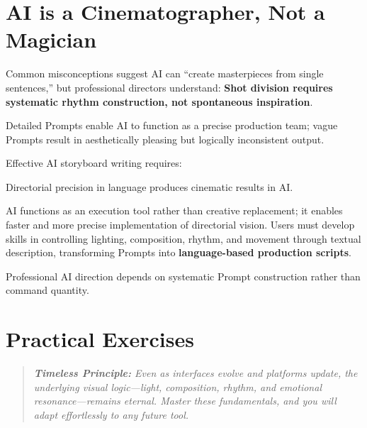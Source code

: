 \section{AI is a Cinematographer, Not a Magician}
\label{sec:ai-cinematographer}

Common misconceptions suggest AI can ``create masterpieces from single sentences,'' but professional directors understand: \textbf{Shot division requires systematic rhythm construction, not spontaneous inspiration}.

Detailed Prompts enable AI to function as a precise production team; vague Prompts result in aesthetically pleasing but logically inconsistent output.

Effective AI storyboard writing requires:

\begin{Prompt}
Directorial precision in language produces cinematic results in AI.
\end{Prompt}

AI functions as an execution tool rather than creative replacement; it enables faster and more precise implementation of directorial vision. Users must develop skills in controlling lighting, composition, rhythm, and movement through textual description, transforming Prompts into \textbf{language-based production scripts}.

Professional AI direction depends on systematic Prompt construction rather than command quantity.

\section*{Practical Exercises}

\begin{quote}
\textit{\textbf{Timeless Principle:} Even as interfaces evolve and platforms update, the underlying visual logic---light, composition, rhythm, and emotional resonance---remains eternal. Master these fundamentals, and you will adapt effortlessly to any future tool.}
\end{quote}

